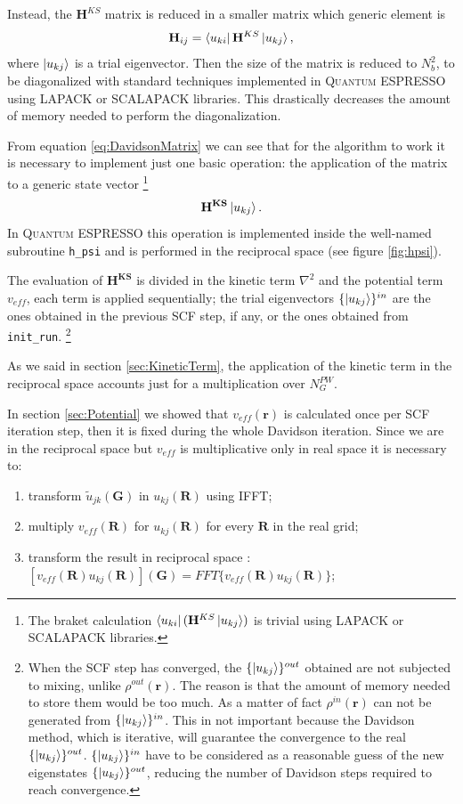 \documentclass[a4paper,12pt]{article}
\newcommand\mf[1]{\mathbf{#1}}
\newcommand\densin{\rho^{in}(\mathbf{r})}
\newcommand\densout{\rho^{out}(\mathbf{r})}
\newcommand\erre{\mathbf{r}}
\newcommand\GI{\mathbf{G}}
\newcommand\QE{\textsc{Quantum} ESPRESSO }
\begin{document}
Instead, the $\mf{H}^{KS}$ matrix is reduced in a smaller matrix which generic element is 
\begin{equation}\label{eq:DavidsonMatrix}
	\mf{H}_{ij} = \bra{u_{ki}}\mf{H}^{KS}\ket{u_{kj}},
\end{equation}
where $\ket{u_{kj}}$ is a trial eigenvector. 
Then the size of the matrix is reduced to $N_{b}^2$, to be diagonalized with standard techniques implemented in \QE using LAPACK or SCALAPACK libraries.
This drastically decreases the amount of memory needed to perform the diagonalization.

From equation \eqref{eq:DavidsonMatrix} we can see that for the algorithm to work it is necessary to implement just one basic operation: the application of the matrix to a generic state vector
\footnote{The braket calculation $ \bra{u_{ki}} (\mf{H}^{KS}\ket{u_{kj}})$ is trivial using LAPACK or SCALAPACK libraries.}
\begin{equation}
	\mf{H^{KS}} \ket{u_{kj}}.
\end{equation}
In \QE this operation is implemented inside the well-named subroutine \texttt{h\_psi} and is performed in the reciprocal space (see figure \ref{fig:hpsi}).

The evaluation of $\mf{H^{KS}}$ is divided in the kinetic term $\nabla^2$ and the potential term $v_{eff}$, each term is applied sequentially; 
the trial eigenvectors $\{\ket{u_{kj}}\}^{in}$  are the ones obtained in the previous SCF step, if any, or the ones obtained from \texttt{init\_run}.
\footnote{When the SCF step has converged, the $\{\ket{u_{kj}}\}^{out}$ obtained are not subjected to mixing, unlike $\densout$. The reason is that the amount of memory needed to store them would be too much. 
As a matter of fact $\densin$ can not be generated from $\{\ket{u_{kj}}\}^{in}$.
This in not important because the Davidson method, which is iterative, will guarantee the convergence to the real $\{\ket{u_{kj}}\}^{out}$. 
$\{\ket{u_{kj}}\}^{in}$ have to be considered as a reasonable guess of the new eigenstates $\{\ket{u_{kj}}\}^{out}$, reducing the number of Davidson steps required to reach convergence.
}

As we said in section \ref{sec:KineticTerm}, the application of the kinetic term in the reciprocal space accounts just for a multiplication over $N^{PW}_G$.

In section \ref{sec:Potential} we showed that $v_{eff}(\erre)$ is calculated once per SCF iteration step, then it is fixed during the whole Davidson iteration. Since we are in the reciprocal space but $v_{eff}$ is multiplicative only in real space it is necessary to: 
\begin{enumerate}
	\item transform $\tilde{u}_{jk}(\GI)$ in $u_{kj}(\mf{R})$ using IFFT;
	\item multiply $v_{eff}(\mf{R})$ for $u_{kj}(\mf{R})$ for every $\mf{R}$ in the real grid;
	\item transform the result in reciprocal space : \\ $[v_{eff}(\mf{R}) u_{kj}(\mf{R})](\GI) = FFT\{v_{eff}(\mf{R}) u_{kj}(\mf{R})\}$;
\end{enumerate}
\end{document}
